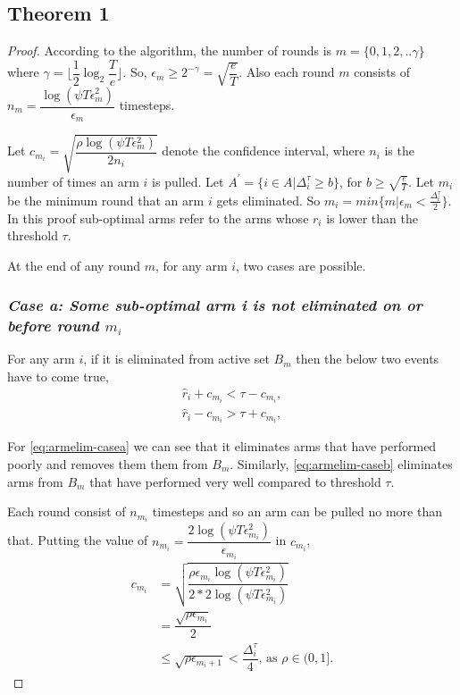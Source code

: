 \subsection{Theorem 1}

\begin{proof}

According to the algorithm, the number of rounds is $m=\lbrace 0,1,2,.. \gamma\rbrace $ where $\gamma=\big\lfloor \dfrac{1}{2}\log_{2} \dfrac{T}{e}\big\rfloor$. So, $\epsilon_{m}\geq 2^{-\gamma} = \sqrt{\dfrac{e}{T}}$. Also each round $m$ consists of $n_{m} = \dfrac{\log(\psi T \epsilon_{m}^{2})}{\epsilon_{m}}$ timesteps.

Let $c_{m_{i}}= \sqrt{\dfrac{\rho\log{(\psi T\epsilon_{m}^{2})}}{2 n_{i}}}$ denote the confidence interval, where $n_{i}$ is the number of times an arm $i$ is pulled. Let $A^{'}=\lbrace i\in A|\Delta_{i}^{\tau}\geq b\rbrace$, for $b\geq \sqrt{\frac{e}{T}}$. Let $m_{i}$ be the minimum round that an arm $i$ gets eliminated. So $m_{i}=min\lbrace m| \epsilon_{m}<\frac{\Delta_{i}^{\tau}}{2}\rbrace$. In this proof sub-optimal arms refer to the arms whose $r_{i}$ is lower than the threshold $\tau$.

At the end of any round $m$, for any arm $i$, two cases are possible.

\subsubsection{\textit{Case a: Some sub-optimal arm i is not eliminated on or before round $m_{i}$}}
For any arm $i$, if it is eliminated from active set $B_{m}$ then the below two events have to come true,
\begin{align}
\hat{r}_{i} + c_{m_{i}} < \tau - c_{m_{i}}, \label{eq:armelim-casea}\\
\hat{r}_{i} - c_{m_{i}} > \tau + c_{m_{i}}, \label{eq:armelim-caseb}
\end{align}

For \ref{eq:armelim-casea} we can see that it eliminates arms that have performed poorly and removes them them from $B_{m}$. Similarly, \ref{eq:armelim-caseb} eliminates arms from $B_{m}$ that have performed very well compared to threshold $\tau$.

Each round consist of $n_{m_{i}}$ timesteps and so an arm can be pulled no more than that.  Putting the value of $n_{m_{i}}=\dfrac{2\log{(\psi T\epsilon_{m_{i}}^{2})}}{\epsilon_{m_{i}}}$ in $c_{m_{i}}$,
\begin{align*}
c_{m_{i}}&=\sqrt{\dfrac{\rho\epsilon_{m_{i}}\log (\psi T\epsilon_{m_{i}}^{2})}{2*2 \log(\psi T\epsilon_{m_{i}}^{2})}}\\
& =\dfrac{\sqrt{\rho\epsilon_{m_{i}}}}{2}\\
& \leq \sqrt{\rho\epsilon_{m_{i}+1}} < \dfrac{\Delta_{i}^{\tau}}{4} \text{, as }\rho\in (0,1].
\end{align*}



\end{proof}
